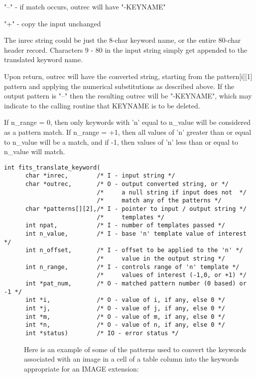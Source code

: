 \documentclass[11pt]{book}
\begin{document}
\begin{description}
    "--" - if match occurs, outrec will have "-KEYNAME"

    "+" - copy the input unchanged

The inrec string could be just the 8-char keyword name, or the entire
80-char header record.  Characters 9 - 80 in the input string simply get
appended to the translated keyword name.

Upon return, outrec will have the converted string, starting from the
pattern[i][1] pattern and applying the numerical substitutions as 
described above. If the output pattern is "--" then the resulting
outrec will be "-KEYNAME", which may indicate to the calling
routine that KEYNAME is to be deleted.

If n\_range = 0, then only keywords with 'n' equal to n\_value will be
considered as a pattern match.  If n\_range = +1, then all values of
'n' greater than or equal to n\_value will be a match, and if -1,
then values of 'n' less than or equal to n\_value will match.\label{translatekey}
\end{description}

\begin{verbatim}
int fits_translate_keyword(
      char *inrec,        /* I - input string */
      char *outrec,       /* O - output converted string, or */
                          /*     a null string if input does not  */
                          /*     match any of the patterns */
      char *patterns[][2],/* I - pointer to input / output string */
                          /*     templates */
      int npat,           /* I - number of templates passed */
      int n_value,        /* I - base 'n' template value of interest */
      int n_offset,       /* I - offset to be applied to the 'n' */
                          /*     value in the output string */
      int n_range,        /* I - controls range of 'n' template */
                          /*     values of interest (-1,0, or +1) */
      int *pat_num,       /* O - matched pattern number (0 based) or -1 */
      int *i,             /* O - value of i, if any, else 0 */
      int *j,             /* O - value of j, if any, else 0 */
      int *m,             /* O - value of m, if any, else 0 */
      int *n,             /* O - value of n, if any, else 0 */
      int *status)        /* IO - error status */
\end{verbatim}

\begin{description}
\item[  ]  Here is an example of some of the patterns used to convert the keywords associated
with an image in a cell of a table column into the keywords appropriate for
an IMAGE extension:
\end{description}
\end{document}

